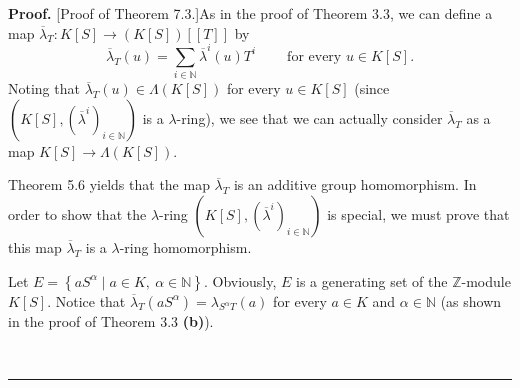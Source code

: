 \documentclass[numbers=enddot,12pt,final,onecolumn,notitlepage]{scrartcl}%
\newenvironment{proof}[1][Proof]{\noindent\textbf{#1.} }{\ \rule{0.5em}{0.5em}}
\begin{document}
\begin{proof}
[Proof of Theorem 7.3.]As in the proof of Theorem 3.3, we can define a map
$\overline{\lambda}_{T}:K\left[  S\right]  \rightarrow\left(  K\left[
S\right]  \right)  \left[  \left[  T\right]  \right]  $ by
\[
\overline{\lambda}_{T}\left(  u\right)  =\sum\limits_{i\in\mathbb{N}}%
\overline{\lambda}^{i}\left(  u\right)  T^{i}\ \ \ \ \ \ \ \ \ \ \text{for
every }u\in K\left[  S\right]  .
\]
Noting that $\overline{\lambda}_{T}\left(  u\right)  \in\Lambda\left(
K\left[  S\right]  \right)  $ for every $u\in K\left[  S\right]  $ (since
$\left(  K\left[  S\right]  ,\left(  \overline{\lambda}^{i}\right)
_{i\in\mathbb{N}}\right)  $ is a $\lambda$-ring), we see that we can actually
consider $\overline{\lambda}_{T}$ as a map $K\left[  S\right]  \rightarrow
\Lambda\left(  K\left[  S\right]  \right)  $.

Theorem 5.6 yields that the map $\overline{\lambda}_{T}$ is an additive group
homomorphism. In order to show that the $\lambda$-ring $\left(  K\left[
S\right]  ,\left(  \overline{\lambda}^{i}\right)  _{i\in\mathbb{N}}\right)  $
is special, we must prove that this map $\overline{\lambda}_{T}$ is a
$\lambda$-ring homomorphism.

Let $E=\left\{  aS^{\alpha}\mid a\in K,\ \alpha\in\mathbb{N}\right\}  $.
Obviously, $E$ is a generating set of the $\mathbb{Z}$-module $K\left[
S\right]  $. Notice that $\overline{\lambda}_{T}\left(  aS^{\alpha}\right)
=\lambda_{S^{\alpha}T}\left(  a\right)  $ for every $a\in K$ and $\alpha
\in\mathbb{N}$ (as shown in the proof of Theorem 3.3 \textbf{(b)}).


\end{proof}
\end{document}
